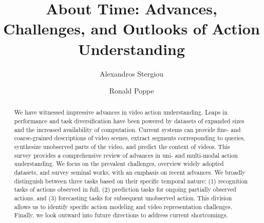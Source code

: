 \documentclass[smallextended,twocolumn,natbib]{svjour3}
\begin{document}
\sloppy

\title{About Time: Advances, Challenges, and Outlooks of Action Understanding}




\author{Alexandros Stergiou \and Ronald Poppe}


\maketitle

\begin{abstract}
We have witnessed impressive advances in video action understanding. Leaps in performance and task diversification have been powered by datasets of expanded sizes and the increased availability of computation. Current systems can provide fine- and coarse-grained descriptions of video scenes, extract segments corresponding to queries, synthesize unobserved parts of the video, and predict the context of videos. This survey provides a comprehensive review of advances in uni- and multi-modal action understanding. We focus on the prevalent challenges, overview widely adopted datasets, and survey seminal works, with an emphasis on recent advances. We broadly distinguish between three tasks based on their specific temporal nature: (1) recognition tasks of actions observed in full, (2) prediction tasks for ongoing partially observed actions, and (3) forecasting tasks for subsequent unobserved action. This division allows us to identify specific action modeling and video representation challenges. Finally, we look outward into future directions to address current shortcomings.

\end{abstract}
\end{document}
